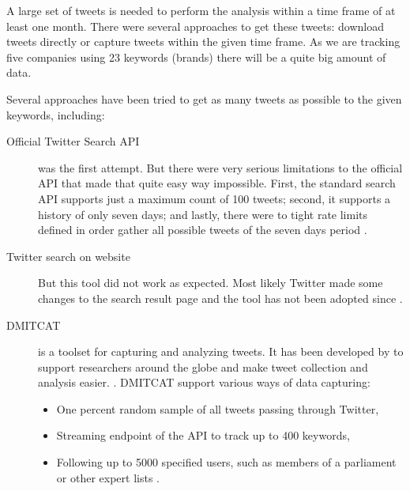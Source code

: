 A large set of tweets is needed to perform the analysis within a time frame of at least one month.
There were several approaches to get these tweets: download tweets directly or capture tweets within the given time frame.
As we are tracking five companies using 23 keywords (brands) there will be a quite big amount of data.

Several approaches have been tried to get as many tweets as possible to the given keywords, including:

\begin{description}
  \item [Official Twitter Search \ac{API}] 
    was the first attempt.
    But there were very serious limitations to the official \ac{API} that made that quite easy way impossible.
    First, the standard search \ac{API} supports just a maximum count of 100 tweets;
    second, it supports a history of only seven days;
    and lastly, there were to tight rate limits defined in order gather all possible tweets of the seven days period \citep{TwitterInc.2018}.

  \item [Twitter search on website]
    But this tool did not work as expected.
    Most likely Twitter made some changes to the search result page and the tool has not been adopted since  \citep{Jefferson2016}.

  \item [\ac{DMITCAT}]
    is a toolset for capturing and analyzing tweets.
    It has been developed by \citeauthor{Borra2014} to support researchers around the globe and make tweet collection and analysis easier.
    \citep{Borra2014}.
    \ac{DMITCAT} support various ways of data capturing:
    \begin{itemize}
      \item One percent random sample of all tweets passing through Twitter,
      \item Streaming endpoint of the \ac{API} to track up to 400 keywords,
      \item Following up to 5000 specified users, such as members of a parliament or other expert lists \citep{Borra2014}.
    \end{itemize}

\end{description}

